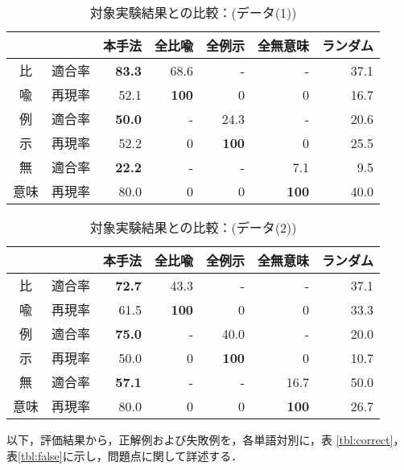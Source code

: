 \begin{table}[tb]
  \begin{center}
     \caption{対象実験結果との比較：(データ(1))}
     \label{tbl:eval1b}
\begin{tabular}{|c|c|r|r|r|r|r|}
\hline
\multicolumn{2}{|c|}{}
		&本手法&全比喩 & 全例示 & 全無意味 & ランダム\\
\hline
比&適合率	&{\bf 83.3}	&68.6	&-	&-	&37.1\\
喩&再現率	&52.1		&{\bf 100}&0	&0	&16.7\\
\hline
例&適合率	&{\bf 50.0}	&-	&24.3	&-	&20.6\\
示&再現率	&52.2		&0	&{\bf 100}&0	&25.5\\
\hline
無&適合率	&{\bf 22.2}	&-	&-	&7.1	&9.5\\
意味&再現率	&80.0		&0	&0	&{\bf 100}&40.0\\
\hline
\end{tabular}
\end{center}
\end{table}
\begin{table}[tb]
  \begin{center}
     \caption{対象実験結果との比較：(データ(2))}
     \label{tbl:eval2b}
\begin{tabular}{|c|c|r|r|r|r|r|}
\hline
\multicolumn{2}{|c|}{}
		&本手法&全比喩 & 全例示 & 全無意味 & ランダム\\
\hline
比&適合率	&{\bf 72.7}	&43.3	&-	&-	&37.1\\
喩&再現率	&61.5		&{\bf 100}&0	&0	&33.3\\
\hline
例&適合率	&{\bf 75.0}	&-	&40.0	&-	&20.0\\
示&再現率	&50.0		&0	&{\bf 100}&0	&10.7\\
\hline
無&適合率	&{\bf 57.1}	&-	&-	&16.7	&50.0\\
意味&再現率	&80.0		&0	&0	&{\bf 100}&26.7\\
\hline
\end{tabular}
\end{center}
\end{table}

以下，評価結果から，正解例および失敗例を，各単語対別に，表
\ref{tbl:correct}，表\ref{tbl:false}に示し，問題点に関して詳述する．

